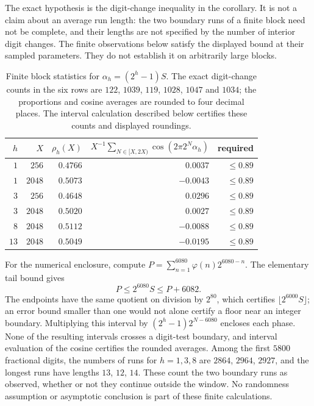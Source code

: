 \noindent
The exact hypothesis is the digit-change inequality in the
corollary. It is not a claim about an average run length: the two boundary
runs of a finite block need not be complete, and their lengths are not
specified by the number of interior digit changes.
The finite observations below satisfy the displayed bound at their sampled
parameters. They do not establish it on arbitrarily large blocks.


\begin{table}[h]\centering
\begin{tabular}{r r r r r}
\hline
$h$ & $X$ & $\rho_h(X)$ & $X^{-1}\sum_{N\in[X,2X)}\cos(2\pi 2^N\alpha_h)$ & required \\
\hline
$1$ & $256$  & $0.4766$ & $\phantom{-}0.0037$ & $\le 0.89$ \\
$1$ & $2048$ & $0.5073$ & $-0.0043$ & $\le 0.89$ \\
$3$ & $256$  & $0.4648$ & $\phantom{-}0.0296$ & $\le 0.89$ \\
$3$ & $2048$ & $0.5020$ & $\phantom{-}0.0027$ & $\le 0.89$ \\
$8$ & $2048$ & $0.5112$ & $-0.0088$ & $\le 0.89$ \\
$13$& $2048$ & $0.5049$ & $-0.0195$ & $\le 0.89$ \\
\hline
\end{tabular}
\caption{Finite block statistics for $\alpha_h=(2^h-1)S$.
The exact digit-change counts in the six rows are $122$, $1039$, $119$,
$1028$, $1047$ and $1034$; the proportions and cosine averages are
rounded to four decimal places. The interval calculation described
below certifies these counts and displayed roundings.}
\label{tab:blocks}
\end{table}

For the numerical enclosure, compute
$P=\sum_{n=1}^{6080}\varphi(n)2^{6080-n}$. The elementary tail bound gives
\[
 P\le2^{6080}S\le P+6082.
\]
The endpoints have the same quotient on division by $2^{80}$, which
certifies $\lfloor2^{6000}S\rfloor$; an error bound smaller than one
would not alone certify a floor near an integer boundary.
Multiplying this interval by $(2^h-1)2^{N-6080}$ encloses each phase.
None of the resulting intervals crosses a digit-test boundary, and
interval evaluation of the cosine certifies the rounded averages.
Among the first $5800$ fractional digits, the numbers of runs for
$h=1,3,8$ are $2864$, $2964$, $2927$, and the longest runs have lengths
$13$, $12$, $14$. These count the two boundary runs as observed, whether
or not they continue outside the window. No randomness assumption or
asymptotic conclusion is part of these finite calculations.

